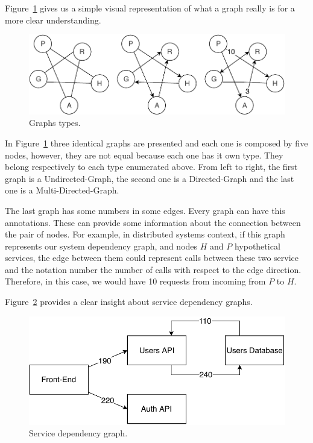 Figure~\ref{fig:graphs_types} gives us a simple visual representation of what a graph really is for a more clear understanding.

\begin{figure}[H]
    \centering
    \includegraphics[width=1.00\textwidth]{images/graph_representations.pdf}
    \caption{Graphs types.}
    \label{fig:graphs_types}
\end{figure}

In Figure~\ref{fig:graphs_types} three identical graphs are presented and each one is composed by five nodes, however, they are not equal because each one has it own type. They belong respectively to each type enumerated above. From left to right, the first graph is a Undirected-Graph, the second one is a Directed-Graph and the last one is a Multi-Directed-Graph.

The last graph has some numbers in some edges. Every graph can have this annotations. These can provide some information about the connection between the pair of nodes. For example, in distributed systems context, if this graph represents our system dependency graph, and nodes $H$ and $P$ hypothetical services, the edge between them could represent calls between these two service and the notation number the number of calls with respect to the edge direction. Therefore, in this case, we would have 10 requests from incoming from $P$ to $H$.

Figure~\ref{fig:service_dependency_graph} provides a clear insight about service dependency graphs.

\begin{figure}[H]
    \centering
    \includegraphics[width=1.00\textwidth]{images/graph_service_representation.pdf}
    \caption{Service dependency graph.}
    \label{fig:service_dependency_graph}
\end{figure}

